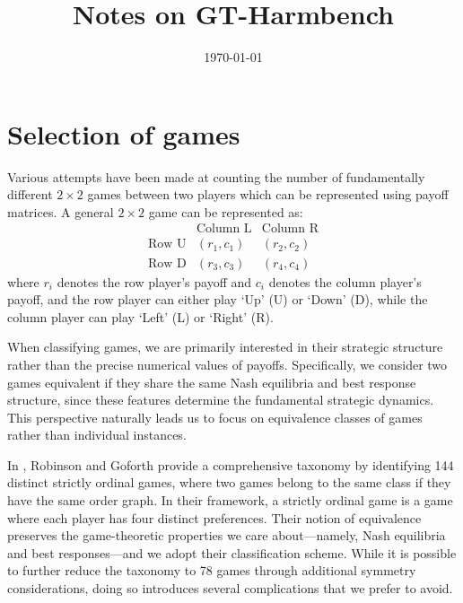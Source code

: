 \documentclass[11pt]{amsart}
\title{Notes on GT-Harmbench}
\author{}
\date{\today}
\begin{document}
\maketitle

\tableofcontents

\section{Selection of games}\label{sec:selection_of_games}

Various attempts have been made at counting the number of fundamentally different $2\times 2$ games between two players which can be represented using payoff matrices. A general $2\times 2$ game can be represented as:
\[
\begin{array}{c|c|c}
  & \text{Column L} & \text{Column R} \\
\hline
\text{Row U} & (r_1, c_1) & (r_2, c_2) \\
\hline
\text{Row D} & (r_3, c_3) & (r_4, c_4)
\end{array}
\]
where $r_i$ denotes the row player's payoff and $c_i$ denotes the column player's payoff, and the row player can either play `Up' (U) or `Down' (D), while the column player can play `Left' (L) or `Right' (R).

When classifying games, we are primarily interested in their strategic structure rather than the precise numerical values of payoffs. Specifically, we consider two games equivalent if they share the same Nash equilibria and best response structure, since these features determine the fundamental strategic dynamics. This perspective naturally leads us to focus on equivalence classes of games rather than individual instances.

In \cite{top}, Robinson and Goforth provide a comprehensive taxonomy by identifying 144 distinct strictly ordinal games, where two games belong to the same class if they have the same order graph. In their framework, a strictly ordinal game is a game where each player has four distinct preferences. Their notion of equivalence preserves the game-theoretic properties we care about---namely, Nash equilibria and best responses---and we adopt their classification scheme. While it is possible to further reduce the taxonomy to 78 games through additional symmetry considerations, doing so introduces several complications that we prefer to avoid.
\end{document}
